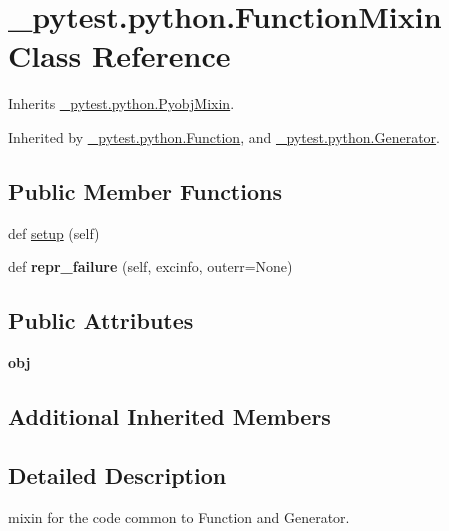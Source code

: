 \hypertarget{class__pytest_1_1python_1_1_function_mixin}{}\section{\+\_\+pytest.\+python.\+Function\+Mixin Class Reference}
\label{class__pytest_1_1python_1_1_function_mixin}


Inherits \hyperlink{class__pytest_1_1python_1_1_pyobj_mixin}{\+\_\+pytest.\+python.\+Pyobj\+Mixin}.



Inherited by \hyperlink{class__pytest_1_1python_1_1_function}{\+\_\+pytest.\+python.\+Function}, and \hyperlink{class__pytest_1_1python_1_1_generator}{\+\_\+pytest.\+python.\+Generator}.

\subsection*{Public Member Functions}
\begin{DoxyCompactItemize}
\item 
def \hyperlink{class__pytest_1_1python_1_1_function_mixin_ae6c067be4ffb2695a34c661d2d6a4396}{setup} (self)
\item 
\mbox{\label{class__pytest_1_1python_1_1_function_mixin_aa0c8bbbc03d7a3deaa166ece6bcedd9c}} 
def {\bfseries repr\+\_\+failure} (self, excinfo, outerr=None)
\end{DoxyCompactItemize}
\subsection*{Public Attributes}
\begin{DoxyCompactItemize}
\item 
\mbox{\label{class__pytest_1_1python_1_1_function_mixin_af29418f6a1990aede4e074d43dcdfcad}} 
{\bfseries obj}
\end{DoxyCompactItemize}
\subsection*{Additional Inherited Members}


\subsection{Detailed Description}
\begin{DoxyVerb}mixin for the code common to Function and Generator.
\end{DoxyVerb}
 

